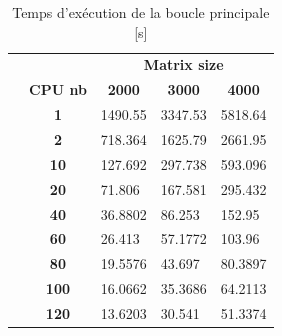 \documentclass[12pt,a4paper,oneside, titlepage]{report}
\begin{document}
\begin{table}[H]
\begin{tabular}{lc|l|l|l|}
\cline{3-5}
                      & \multicolumn{1}{l|}{} & \multicolumn{3}{c|}{\textbf{Matrix size}}                                                                    \\ \cline{2-5}
\multicolumn{1}{l|}{} & \textbf{CPU nb}       & \multicolumn{1}{c|}{\textbf{2000}} & \multicolumn{1}{c|}{\textbf{3000}} & \multicolumn{1}{c|}{\textbf{4000}} \\ \cline{2-5}
\multicolumn{1}{l|}{} & \textbf{1}            & 1490.55                            & 3347.53                            & 5818.64                            \\ \cline{2-5}
\multicolumn{1}{l|}{} & \textbf{2}            & 718.364                            & 1625.79                            & 2661.95                            \\ \cline{2-5}
\multicolumn{1}{l|}{} & \textbf{10}           & 127.692                            & 297.738                            & 593.096                            \\ \cline{2-5}
\multicolumn{1}{l|}{} & \textbf{20}           & 71.806                             & 167.581                            & 295.432                            \\ \cline{2-5}
\multicolumn{1}{l|}{} & \textbf{40}           & 36.8802                            & 86.253                             & 152.95                             \\ \cline{2-5}
\multicolumn{1}{l|}{} & \textbf{60}           & 26.413                             & 57.1772                            & 103.96                             \\ \cline{2-5}
\multicolumn{1}{l|}{} & \textbf{80}           & 19.5576                            & 43.697                             & 80.3897                            \\ \cline{2-5}
\multicolumn{1}{l|}{} & \textbf{100}          & 16.0662                            & 35.3686                            & 64.2113                            \\ \cline{2-5}
\multicolumn{1}{l|}{} & \textbf{120}          & 13.6203                            & 30.541                             & 51.3374                            \\ \cline{2-5}
\end{tabular}
\caption{Temps d'exécution de la boucle principale [s]}
\end{table}
\end{document}
